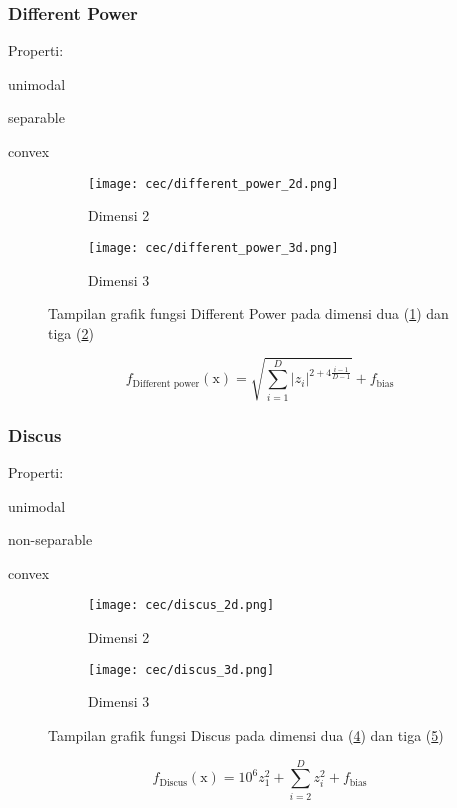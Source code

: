 \subsubsection*{Different Power}
\noindent Properti:
\begin{packed_item}
  \item unimodal
  \item separable
  \item convex
\end{packed_item}
\begin{figure}[H]
	\centering
	\begin{subfigure}[b]{0.4\textwidth}
		\centering
		\texttt{[image: cec/different\_power\_2d.png]}
		\caption{Dimensi 2}
		\label{fig:diffpower-2d}
	\end{subfigure}
	\hfill
	\begin{subfigure}[b]{0.4\textwidth}
		\centering
		\texttt{[image: cec/different\_power\_3d.png]}
		\caption{Dimensi 3}
		\label{fig:diffpower-3d}
	\end{subfigure}
	\caption{Tampilan grafik fungsi Different Power pada dimensi dua (\cref{fig:diffpower-2d}) dan tiga (\cref{fig:diffpower-3d})}
	\label{fig:diffpower}
\end{figure}
\begin{equation}
  f_{\text{Different power}}(\mathrm{x})=\sqrt{\sum_{i=1}^{D}\left| z_i \right|^{2+4\frac{i-1}{D-1}} }+f_{\text{bias}}
\end{equation}

\subsubsection*{Discus}
\noindent Properti:
\begin{packed_item}
  \item unimodal
  \item non-separable
  \item convex
\end{packed_item}
\begin{figure}[H]
	\centering
	\begin{subfigure}[b]{0.4\textwidth}
		\centering
		\texttt{[image: cec/discus\_2d.png]}
		\caption{Dimensi 2}
		\label{fig:discus-2d}
	\end{subfigure}
	\hfill
	\begin{subfigure}[b]{0.4\textwidth}
		\centering
		\texttt{[image: cec/discus\_3d.png]}
		\caption{Dimensi 3}
		\label{fig:discus-3d}
	\end{subfigure}
	\caption{Tampilan grafik fungsi Discus pada dimensi dua (\cref{fig:discus-2d}) dan tiga (\cref{fig:discus-3d})}
	\label{fig:discus}
\end{figure}
\begin{equation}
  f_{\text{Discus}}(\mathrm{x})=10^6z_1^2+\sum_{i=2}^{D}z_i^2+f_{\text{bias}}
\end{equation}

